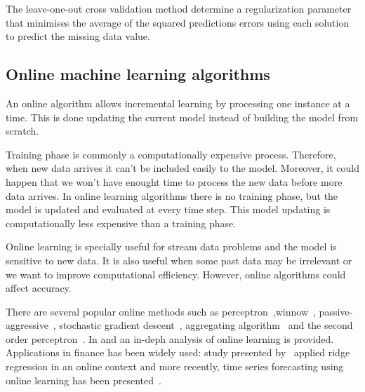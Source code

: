 The leave-one-out cross validation method determine a regularization parameter that minimises the average of the squared predictions errors using each solution to predict the missing data value.




\subsection{Online machine learning algorithms}

An online algorithm allows incremental learning by processing one instance at a
time. This is done updating the current model instead of building the model from
scratch.

Training phase is commonly a computationally expensive process. Therefore, when
new data arrives it can't be included easily to the model. Moreover, it could
happen that we won't have enought time to process the new data before more data
arrives. In online learning algorithms there is no training phase, but the model
is updated and evaluated at every time step. This model updating is
computationally less expensive than a training phase.

Online learning is specially useful for stream data problems and the model is
sensitive to new data. It is also useful when some past data may be irrelevant
or we want to improve computational efficiency. However, online algorithms could
affect accuracy.

There are several popular online methods such as
perceptron~\cite{rosenblatt58},winnow~\cite{littlestone1988},
passive-aggressive~\cite{crammerETall2006}, stochastic gradient
descent~\cite{zhang2004}, aggregating algorithm~\cite{vovk2001} and the second
order perceptron~\cite{cesa-bianchi2005}.  In \cite{blum1998} and
\cite{cesa-bianchi2006} an in-deph analysis of online learning is provided.
Applications in finance has been widely used: study presented
by~\cite{arce+salinas2012} applied ridge regression in an online context and
more recently, time series forecasting using online learning has been
presented~\cite{anavaetAl2013}.

